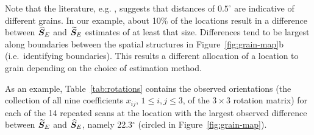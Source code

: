 %
Note that the literature, e.g. \cite{bingham10b}, suggests that distances of $0.5^\circ$ are indicative of different grains. In our example, about 10\% of the locations result in a difference between ${\widehat{\bm S}_E}$ and ${\widetilde{\bm S}_E}$ estimates of at least that size. Differences tend to be largest along boundaries between the spatial structures in Figure~\ref{fig:grain-map}b  (i.e.~identifying boundaries). This results a different allocation of a location to  grain depending on the choice of estimation method.

As an example, Table~\ref{tab:rotations} contains the observed orientations (the collection of all nine coefficients $x_{ij}$, $1 \le i,j \le 3$, of the $3\times 3$ rotation matrix) for each of the 14 repeated scans at the location with the largest observed difference between ${\widetilde{\bm S}_E}$ and ${\widehat{\bm S}_E}$, namely 22.3$^\circ$ (circled in Figure~\ref{fig:grain-map}). 
 


